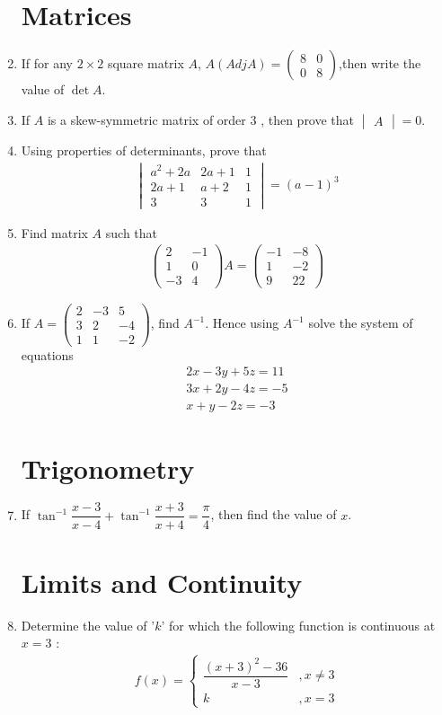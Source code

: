 \documentclass{article}
\providecommand{\brak}[1]{\ensuremath{\left(#1\right)}}
\newcommand{\myvec}[1]{\ensuremath{\begin{pmatrix}#1\end{pmatrix}}}
\newcommand{\mydet}[1]{\ensuremath{\begin{vmatrix}#1\end{vmatrix}}}
\providecommand{\mydet}[1]{\ensuremath{\begin{vmatrix}#1\end{vmatrix}}}
\providecommand{\myvec}[1]{\ensuremath{\begin{bmatrix}#1\end{bmatrix}}}
\begin{document}
\begin{enumerate}
\section{Matrices}
\item If for any $2\times2$ square matrix $A$, $A\brak{Adj A} =\myvec{8&0\\0&8}$,then write the value of $\det{A}$.
\item If $A$ is a skew-symmetric matrix of order $3$ , then prove that $\mydet{A}=0$.
\item Using properties of determinants, prove that \begin{align*}\mydet{a^{2}+2a & 2a+1 & 1 \\ 2a+1 & a+2 & 1 \\ 3 & 3 & 1} = \brak{a-1}^3\end{align*}
\item Find matrix $A$ such that
\begin{align*}
   \myvec{2 & -1 \\1 & 0 \\-3 & 4} A=\myvec{-1 & -8 \\1 & -2 \\9 & 22} 
\end{align*}
\item If $A=\myvec{2 & -3 & 5\\3 & 2 & -4\\1 & 1 & -2}$, find $A^{-1}$. Hence using $A^{-1}$ solve the system of equations \begin{align*}
    2x-3y+5z=11\\3x+2y-4z=-5\\x+y-2z=-3
\end{align*}
\section{Trigonometry}
\item If $\tan ^{-1} \dfrac{x-3}{x-4}+\tan ^{-1} \dfrac{x+3}{x+4}=\dfrac{\pi}{4}$, then find the value of $x$.
\section{Limits and Continuity}
\item Determine the value of '$k$' for which the following function is continuous at $x=3$ :
\begin{align*}
  f\brak{x}=\left\{\begin{array}{cc}
\dfrac{\brak{x+3}^2-36}{x-3} & , x \neq 3 \\
k & , x=3
\end{array}\right.  
\end{align*}
\end{enumerate}
\end{document}
